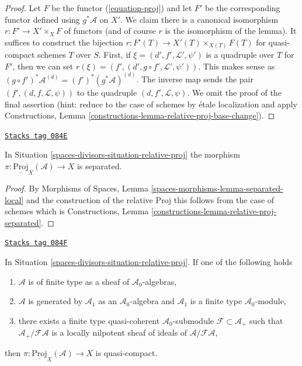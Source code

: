 \begin{proof}
Let $F$ be the functor (\ref{equation-proj}) and let $F'$ be the
corresponding functor defined using $g^*\mathcal{A}$ on $X'$.
We claim there is a canonical isomorphism $r : F' \to X' \times_X F$
of functors (and of course $r$ is the isomorphism of the lemma).
It suffices to construct the bijection
$r : F'(T) \to X'(T) \times_{X(T)} F(T)$ for quasi-compact schemes $T$
over $S$. First, if $\xi = (d', f', \mathcal{L}', \psi')$ is a
quadruple over $T$ for $F'$, then we can set
$r(\xi) = (f', (d', g \circ f', \mathcal{L}', \psi'))$. This makes sense
as $(g \circ f')^*\mathcal{A}^{(d)} = (f')^*(g^*\mathcal{A})^{(d)}$.
The inverse map sends the pair $(f', (d, f, \mathcal{L}, \psi))$
to the quadruple $(d, f', \mathcal{L}, \psi)$. We omit the proof
of the final assertion (hint: reduce to the case of schemes by \'etale
localization and apply Constructions, Lemma
\ref{constructions-lemma-relative-proj-base-change}).
\end{proof}

\begin{lemma}
\label{spaces-divisors-lemma-relative-proj-separated}
\href{https://stacks.math.columbia.edu/tag/084E}{\texttt{Stacks tag 084E}}

In Situation \ref{spaces-divisors-situation-relative-proj} the morphism
$\pi : \underline{\text{Proj}}_X(\mathcal{A}) \to X$
is separated.
\end{lemma}

\begin{proof}
By Morphisms of Spaces, Lemma \ref{spaces-morphisms-lemma-separated-local}
and the construction of the relative Proj this follows from the
case of schemes which is
Constructions, Lemma \ref{constructions-lemma-relative-proj-separated}.
\end{proof}

\begin{lemma}
\label{spaces-divisors-lemma-relative-proj-quasi-compact}
\href{https://stacks.math.columbia.edu/tag/084F}{\texttt{Stacks tag 084F}}

In Situation \ref{spaces-divisors-situation-relative-proj}. If one of the following holds
\begin{enumerate}
\item $\mathcal{A}$ is of finite type as a sheaf of
$\mathcal{A}_0$-algebras,
\item $\mathcal{A}$ is generated by $\mathcal{A}_1$ as an
$\mathcal{A}_0$-algebra and $\mathcal{A}_1$ is a finite type
$\mathcal{A}_0$-module,
\item there exists a finite type quasi-coherent $\mathcal{A}_0$-submodule
$\mathcal{F} \subset \mathcal{A}_{+}$ such that
$\mathcal{A}_{+}/\mathcal{F}\mathcal{A}$ is a locally nilpotent
sheaf of ideals of $\mathcal{A}/\mathcal{F}\mathcal{A}$,
\end{enumerate}
then $\pi : \underline{\text{Proj}}_X(\mathcal{A}) \to X$ is quasi-compact.
\end{lemma}

